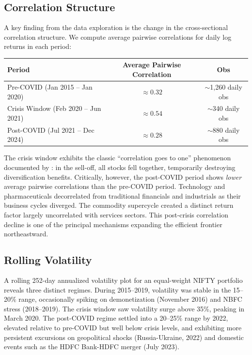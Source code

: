 \documentclass[12pt,a4paper]{article}
\begin{document}
\subsection{Correlation Structure}

A key finding from the data exploration is the change in the cross-sectional correlation
structure. We compute average pairwise correlations for daily log returns in each period:

\begin{center}
\begin{tabular}{lcc}
\toprule
Period & Average Pairwise Correlation & Obs \\
\midrule
Pre-COVID (Jan 2015 -- Jan 2020) & $\approx 0.32$ & $\sim$1,260 daily obs \\
Crisis Window (Feb 2020 -- Jun 2021) & $\approx 0.54$ & $\sim$340 daily obs \\
Post-COVID (Jul 2021 -- Dec 2024) & $\approx 0.28$ & $\sim$880 daily obs \\
\bottomrule
\end{tabular}
\end{center}

The crisis window exhibits the classic ``correlation goes to one'' phenomenon documented
by \citet{LonginSolnik2001}: in the sell-off, all stocks fell together, temporarily
destroying diversification benefits. Critically, however, the post-COVID period shows
\textit{lower} average pairwise correlations than the pre-COVID period. Technology and
pharmaceuticals decorrelated from traditional financials and industrials as their
business cycles diverged. The commodity supercycle created a distinct return factor
largely uncorrelated with services sectors. This post-crisis correlation decline is one
of the principal mechanisms expanding the efficient frontier northeastward.

\subsection{Rolling Volatility}

A rolling 252-day annualized volatility plot for an equal-weight NIFTY portfolio reveals
three distinct regimes. During 2015--2019, volatility was stable in the 15--20\% range,
occasionally spiking on demonetization (November 2016) and NBFC stress (2018--2019).
The crisis window saw volatility surge above 35\%, peaking in March 2020. The post-COVID
regime settled into a 20--25\% range by 2022, elevated relative to pre-COVID but well
below crisis levels, and exhibiting more persistent excursions on geopolitical shocks
(Russia-Ukraine, 2022) and domestic events such as the HDFC Bank-HDFC merger (July 2023).
\end{document}
